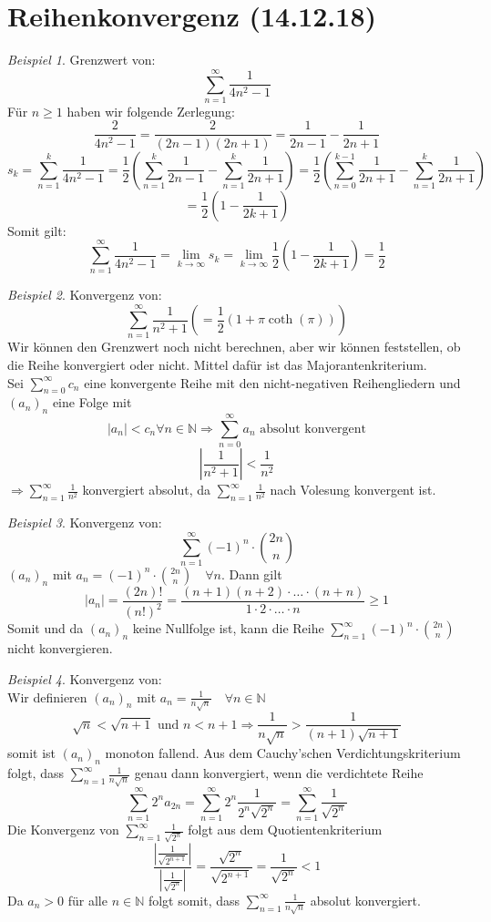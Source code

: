 \documentclass[12pt,a4paper,titlepage]{article} %
\theoremstyle{definition}
\theoremstyle{remark}
\newtheorem*{bsp}{Beispiel}
\newcommand{\N}{\mathbb{N}}
\newcommand{\limes}[1]{\lim\limits_{#1\rightarrow\infty}}
\begin{document}
	\section{Reihenkonvergenz (14.12.18)}
	\begin{bsp}
		Grenzwert von:
		\[\sum_{n=1}^{\infty} \frac{1}{4n^2 - 1}\]
		Für \(n \geq 1\) haben wir folgende Zerlegung:
		\[\frac{2}{4n^2 - 1} = \frac{2}{(2n - 1)(2n + 1)} = \frac{1}{2n-1} - \frac{1}{2n+1}\]
		\[s_k = \sum_{n=1}^{k} \frac{1}{4n^2-1} = \frac{1}{2}\left(\sum_{n=1}^{k} \frac{1}{2n-1} - \sum_{n=1}^{k} \frac{1}{2n+1} \right) = \frac{1}{2}\left(\sum_{n=0}^{k-1} \frac{1}{2n+1} - \sum_{n=1}^{k} \frac{1}{2n+1} \right)\]
		\[= \frac{1}{2}\left(1 - \frac{1}{2k+1}\right)\]
		Somit gilt:
		\[\sum_{n=1}^{\infty} \frac{1}{4n^2 - 1} = \limes{k} s_k = \limes{k} \frac{1}{2}\left(1 - \frac{1}{2k+1}\right) = \frac{1}{2} \]
	\end{bsp}
	\begin{bsp}
		Konvergenz von:
		\[\sum_{n=1}^{\infty} \frac{1}{n^2+1} \left(= \frac{1}{2}(1 + \pi \coth(\pi)) \right)\]
		Wir können den Grenzwert noch nicht berechnen, aber wir können feststellen, ob die Reihe konvergiert oder nicht. Mittel dafür ist das Majorantenkriterium.\\
		Sei \(\sum_{n=0}^{\infty}c_n \) eine konvergente Reihe mit den nicht-negativen Reihengliedern und \((a_n)_n\) eine Folge mit
		\[|a_n| < c_n \forall n \in \N \Rightarrow \sum_{n=0}^{\infty} a_n \text{ absolut konvergent}\]
		\[\left|\frac{1}{n^2+1}\right| < \frac{1}{n^2}\]
		\(\Rightarrow \sum_{n=1}^{\infty} \frac{1}{n^2}\) konvergiert absolut, da \(\sum_{n=1}^{\infty} \frac{1}{n^2}\) nach Volesung konvergent ist.
	\end{bsp}
	\begin{bsp}
		Konvergenz von:\[\sum_{n=1}^{\infty} (-1)^n \cdot \binom{2n}{n}\]
		\((a_n)_n\) mit \(a_n = (-1)^n \cdot \binom{2n}{n} \quad \forall n\). Dann gilt
		\[|a_n| = \frac{(2n)!}{(n!)^2} = \frac{(n+1)(n+2) \cdot \hdots \cdot (n+n)}{1 \cdot 2 \cdot \hdots \cdot n} \geq 1\]
		Somit und da \((a_n)_n\) keine Nullfolge ist, kann die Reihe \(\sum_{n=1}^{\infty} (-1)^n \cdot \binom{2n}{n}\) nicht konvergieren.
	\end{bsp}
	\begin{bsp}
		Konvergenz von:\\
		Wir definieren \((a_n)_n\) mit \(a_n = \frac{1}{n\sqrt{n}} \quad \forall n \in \N\)\\
		\[\sqrt{n} < \sqrt{n+1} \text{ und } n < n+1 \Rightarrow \frac{1}{n\sqrt{n}} > \frac{1}{(n+1)\sqrt{n+1}}\]
		somit ist \((a_n)_n\) monoton fallend. Aus dem Cauchy'schen Verdichtungskriterium folgt, dass \(\sum_{n=1}^{\infty} \frac{1}{n\sqrt{n}}\) genau dann konvergiert, wenn die verdichtete Reihe
		\[\sum_{n=1}^{\infty} 2^n a_{2n} = \sum_{n=1}^{\infty} 2^n \frac{1}{2^n\sqrt{2^n}} = \sum_{n=1}^{\infty} \frac{1}{\sqrt{2^n}}\]
		Die Konvergenz von \(\sum_{n=1}^{\infty} \frac{1}{\sqrt{2^n}}\) folgt aus dem Quotientenkriterium
		\[\frac{\left|\frac{1}{\sqrt{2^{n+1}}}\right|}{\left|\frac{1}{\sqrt{2^n}}\right|} = \frac{\sqrt{2^n}}{\sqrt{2^{n+1}}} = \frac{1}{\sqrt{2^n}} < 1\]
		Da \(a_n > 0\) für alle \(n \in \N\) folgt somit, dass \(\sum_{n=1}^{\infty} \frac{1}{n\sqrt{n}}\) absolut konvergiert.
	\end{bsp}
\end{document}
